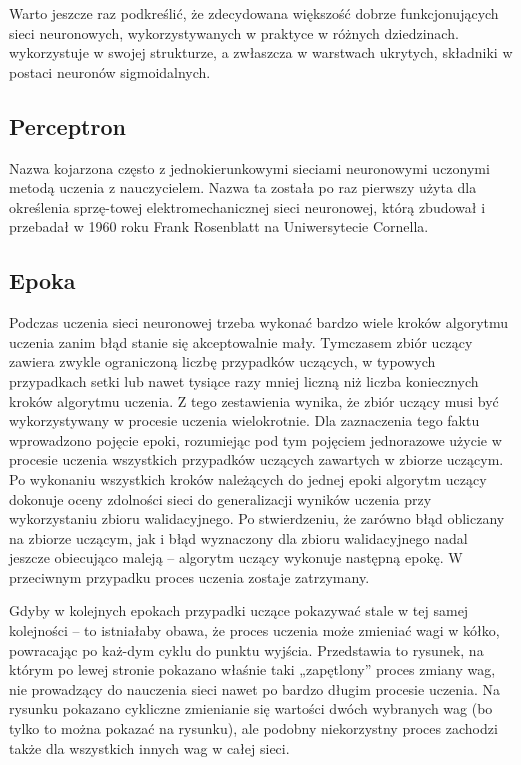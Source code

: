 \documentclass{article}
\begin{document}
Warto jeszcze raz podkreślić, że zdecydowana większość dobrze funkcjonujących sieci neuronowych,
wykorzystywanych w praktyce w różnych dziedzinach. wykorzystuje w swojej strukturze,
a zwłaszcza w warstwach ukrytych, składniki w postaci neuronów sigmoidalnych.

\subsection{Perceptron}

Nazwa kojarzona często z jednokierunkowymi sieciami neuronowymi uczonymi metodą uczenia z nauczycielem.
Nazwa ta została po raz pierwszy użyta dla określenia sprzę-towej elektromechanicznej sieci neuronowej,
którą zbudował i przebadał  w 1960 roku Frank Rosenblatt na Uniwersytecie Cornella.

\subsection{Epoka}

Podczas uczenia sieci neuronowej trzeba wykonać bardzo wiele kroków algorytmu uczenia zanim błąd
stanie się akceptowalnie mały. Tymczasem zbiór uczący zawiera zwykle ograniczoną liczbę przypadków
uczących, w typowych przypadkach setki lub nawet tysiące razy mniej liczną niż liczba
koniecznych kroków algorytmu uczenia. Z tego zestawienia wynika, że zbiór uczący musi
być wykorzystywany w procesie uczenia wielokrotnie. Dla zaznaczenia tego faktu wprowadzono
pojęcie epoki, rozumiejąc pod tym pojęciem jednorazowe użycie w procesie uczenia wszystkich
przypadków uczących zawartych w zbiorze uczącym. Po wykonaniu wszystkich kroków należących
do jednej epoki algorytm uczący dokonuje oceny zdolności sieci do generalizacji wyników
uczenia przy wykorzystaniu zbioru walidacyjnego. Po stwierdzeniu, że zarówno błąd obliczany
na zbiorze uczącym, jak i błąd wyznaczony dla zbioru walidacyjnego nadal jeszcze obiecująco
maleją – algorytm uczący wykonuje następną epokę. W przeciwnym przypadku proces uczenia
zostaje zatrzymany.

Gdyby w  kolejnych epokach przypadki uczące pokazywać stale w tej samej
kolejności – to istniałaby obawa, że proces uczenia może zmieniać wagi w kółko,
powracając po każ-dym cyklu do punktu wyjścia. Przedstawia to rysunek, na którym
po lewej stronie pokazano właśnie taki „zapętlony” proces zmiany wag, nie prowadzący
do nauczenia sieci nawet po bardzo długim procesie uczenia. Na rysunku pokazano cykliczne
zmienianie się wartości dwóch wybranych wag (bo tylko to można pokazać na rysunku),
ale podobny niekorzystny proces zachodzi także dla wszystkich innych wag w całej sieci.
\end{document}
